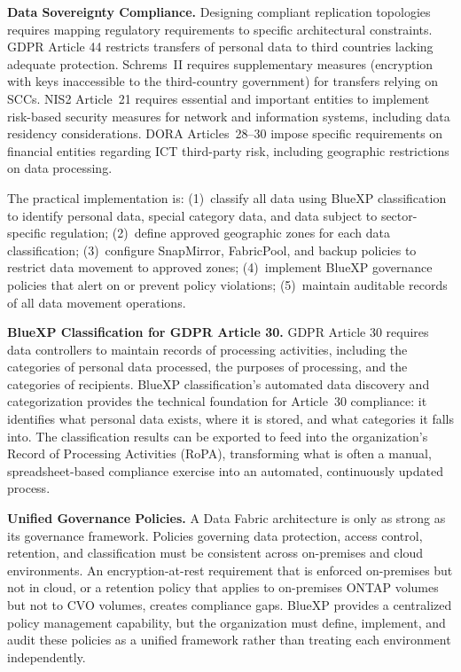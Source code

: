 \begin{securitybox}
\textbf{Data Sovereignty Compliance.}
Designing compliant replication topologies requires mapping regulatory
requirements to specific architectural constraints. GDPR Article 44 restricts
transfers of personal data to third countries lacking adequate protection.
Schrems~II requires supplementary measures (encryption with keys inaccessible
to the third-country government) for transfers relying on SCCs. NIS2
Article~21 requires essential and important entities to implement risk-based
security measures for network and information systems, including data
residency considerations. DORA Articles~28--30 impose specific requirements on
financial entities regarding ICT third-party risk, including geographic
restrictions on data processing.

The practical implementation is: (1)~classify all data using BlueXP
classification to identify personal data, special category data, and data
subject to sector-specific regulation; (2)~define approved geographic zones
for each data classification; (3)~configure SnapMirror, FabricPool, and
backup policies to restrict data movement to approved zones; (4)~implement
BlueXP governance policies that alert on or prevent policy violations;
(5)~maintain auditable records of all data movement operations.

\textbf{BlueXP Classification for GDPR Article 30.}
GDPR Article 30 requires data controllers to maintain records of processing
activities, including the categories of personal data processed, the purposes
of processing, and the categories of recipients. BlueXP classification's
automated data discovery and categorization provides the technical foundation
for Article~30 compliance: it identifies what personal data exists, where it
is stored, and what categories it falls into. The classification results can
be exported to feed into the organization's Record of Processing Activities
(RoPA), transforming what is often a manual, spreadsheet-based compliance
exercise into an automated, continuously updated process.

\textbf{Unified Governance Policies.}
A Data Fabric architecture is only as strong as its governance framework.
Policies governing data protection, access control, retention, and
classification must be consistent across on-premises and cloud environments.
An encryption-at-rest requirement that is enforced on-premises but not in
cloud, or a retention policy that applies to on-premises ONTAP volumes but not
to CVO volumes, creates compliance gaps. BlueXP provides a centralized policy
management capability, but the organization must define, implement, and audit
these policies as a unified framework rather than treating each environment
independently.


\end{securitybox}
